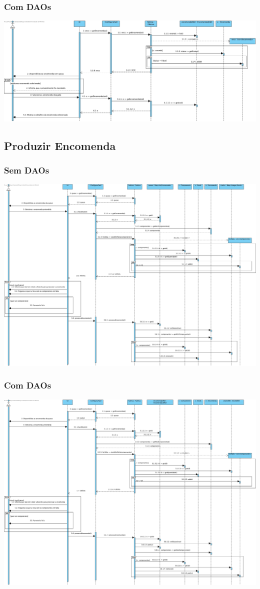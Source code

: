 \subsubsection{Com DAOs}
\begin{center}
 	\includegraphics[width = 5.5in]{DSI_D/DSI-DAOs-Consultar_Encomenda.jpg}
\end{center}


\subsection{Produzir Encomenda}
\subsubsection{Sem DAOs}
\begin{center}
 	\includegraphics[width = 5.5in]{DSI/DSI-Produzir_Encomenda.jpg}
\end{center}
\subsubsection{Com DAOs}
\begin{center}
 	\includegraphics[width = 5.5in]{DSI_D/DSI-DAOs-Produzir_Encomenda.jpg}
\end{center}
\newpage